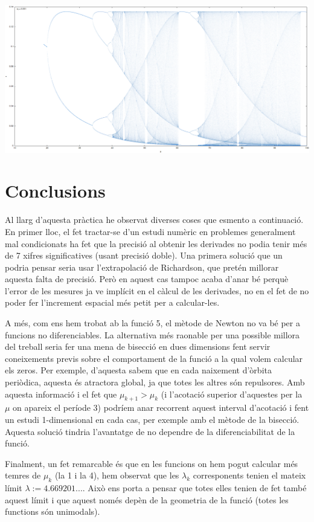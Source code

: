 \documentclass[a4paper]{article}
\theoremstyle{definition}
\begin{document}
\begin{center}
  \begin{minipage}{\linewidth}
    \centering
    \includegraphics[width=0.8\linewidth]{Images/map6.png}
  \end{minipage}
\end{center}
\newpage
\section{Conclusions}
Al llarg d'aquesta pràctica he observat diverses coses que esmento a continuació. En primer lloc, el fet tractar-se d'un estudi numèric en problemes generalment mal condicionats ha fet que la precisió al obtenir les derivades no podia tenir més de 7 xifres significatives (usant precisió doble). Una primera solució que un podria pensar seria usar l'extrapolació de Richardson, que pretén millorar aquesta falta de precisió. Però en aquest cas tampoc acaba d'anar bé perquè l'error de les mesures ja ve implícit en el càlcul de les derivades, no en el fet de no poder fer l'increment espacial més petit per a calcular-les.

A més, com ens hem trobat ab la funció 5, el mètode de Newton no va bé per a funcions no diferenciables. La alternativa més raonable per una possible millora del treball seria fer una mena de bisecció en dues dimensions fent servir coneixements previs sobre el comportament de la funció a la qual volem calcular els zeros. Per exemple, d'aquesta sabem que en cada naixement d'òrbita periòdica, aquesta és atractora global, ja que totes les altres són repulsores. Amb aquesta informació i el fet que $\mu_{k+1}>\mu_k$ (i l'acotació superior d'aquestes per la $\mu$ on apareix el període 3) podríem anar recorrent aquest interval d'acotació i fent un estudi 1-dimensional en cada cas, per exemple amb el mètode de la bisecció. Aquesta solució tindria l'avantatge de no dependre de la diferenciabilitat de la funció.

Finalment, un fet remarcable és que en les funcions on hem pogut calcular més temres de $\mu_k$ (la 1 i la 4), hem observat que les $\lambda_k$ corresponents tenien el mateix límit $\lambda:=4.669201...$. Això ens porta a pensar que totes elles tenien de fet també aquest límit i que aquest només depèn de la geometria de la funció (totes les functions són unimodals).
\end{document}
